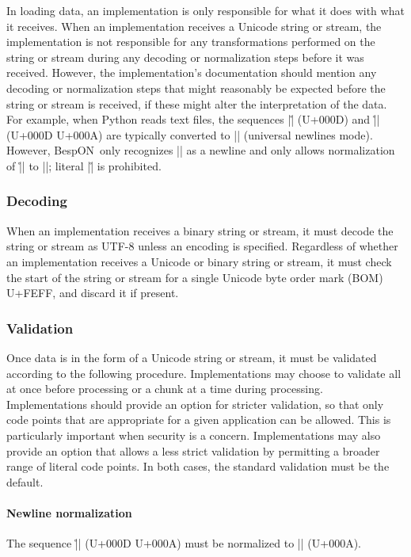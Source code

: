 \documentclass[11pt]{article}
\newcommand{\bespon}{BespON}
\begin{document}
In loading data, an implementation is only responsible for what it does with what it receives.  When an implementation receives a Unicode string or stream, the implementation is not responsible for any transformations performed on the string or stream during any decoding or normalization steps before it was received.  However, the implementation's documentation should mention any decoding or normalization steps that might reasonably be expected before the string or stream is received, if these might alter the interpretation of the data.  For example, when Python reads text files, the sequences |\r| (U+000D) and |\r\n| (U+000D U+000A) are typically converted to |\n| (universal newlines mode).  However, \bespon\ only recognizes |\n| as a newline and only allows normalization of |\r\n| to |\n|; literal |\r| is prohibited.

\subsubsection{Decoding}

When an implementation receives a binary string or stream, it must decode the string or stream as UTF-8 unless an encoding is specified.  Regardless of whether an implementation receives a Unicode or binary string or stream, it must check the start of the string or stream for a single Unicode byte order mark (BOM) U+FEFF, and discard it if present.

\subsubsection{Validation}
Once data is in the form of a Unicode string or stream, it must be validated according to the following procedure.  Implementations may choose to validate all at once before processing or a chunk at a time during processing.  Implementations should provide an option for stricter validation, so that only code points that are appropriate for a given application can be allowed.  This is particularly important when security is a concern.  Implementations may also provide an option that allows a less strict validation by permitting a broader range of literal code points.  In both cases, the standard validation must be the default.

\paragraph{Newline normalization}  The sequence |\r\n| (U+000D U+000A) must be normalized to |\n| (U+000A).
\end{document}
